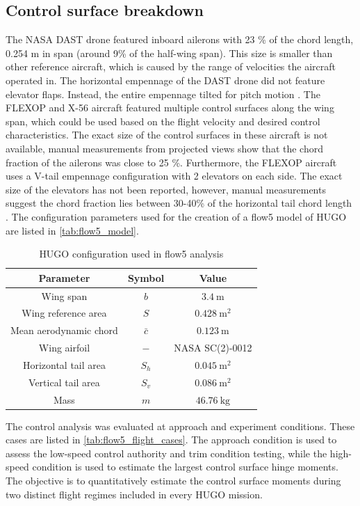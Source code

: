\subsection{Control surface breakdown}

The NASA DAST drone featured inboard ailerons with 23 \% of the chord length, 0.254 m in span (around 9\% of the half-wing span). This size is smaller than other reference aircraft, which is caused by the range of velocities the aircraft operated in. The horizontal empennage of the DAST drone did not feature elevator flaps. Instead, the entire empennage tilted for pitch motion \cite{Gilyard1983}. The FLEXOP and X-56 aircraft featured multiple control surfaces along the wing span, which could be used based on the flight velocity and desired control characteristics. The exact size of the control surfaces in these aircraft is not available, manual measurements from projected views show that the chord fraction of the ailerons was close to 25 \%. Furthermore, the FLEXOP aircraft uses a V-tail empennage configuration with 2 elevators on each side. The exact size of the elevators has not been reported, however, manual measurements suggest the chord fraction lies between 30-40\% of the horizontal tail chord length \cite{Takarics2019} \cite{Schaefer2023}. The configuration parameters used for the creation of a flow5 model of HUGO are listed in \autoref{tab:flow5_model}.


\begin{table}[H]
    \centering
    \caption{HUGO configuration used in flow5 analysis}
    \label{tab:flow5_model}
    \begin{tabular}{|c|c|c|}
        \hline
        \textbf{Parameter} & \textbf{Symbol} & \textbf{Value} \\
        \hline\hline
        Wing span & $b$ & \(3.4~\mathrm{m}\) \\\hline
        Wing reference area & $S$ & \(0.428~\mathrm{m^2}\) \\\hline
        Mean aerodynamic chord & $\bar{c}$ & \(0.123~\mathrm{m}\) \\\hline
        Wing airfoil & $-$ & NASA SC(2)-0012 \\\hline
        Horizontal tail area & $S_h$ & \(0.045~\mathrm{m^2}\) \\\hline
        Vertical tail area & $S_v$ & \(0.086~\mathrm{m^2}\) \\\hline
        Mass & $m$ & \(46.76~\mathrm{kg}\) \\
        \hline
    \end{tabular}
\end{table}
The control analysis was evaluated at approach and experiment conditions. These cases are listed in \autoref{tab:flow5_flight_cases}. The approach condition is used to assess the low-speed control authority and trim condition testing, while the high-speed condition is used to estimate the largest control surface hinge moments. The objective is to quantitatively estimate the control surface moments during two distinct flight regimes included in every HUGO mission.

